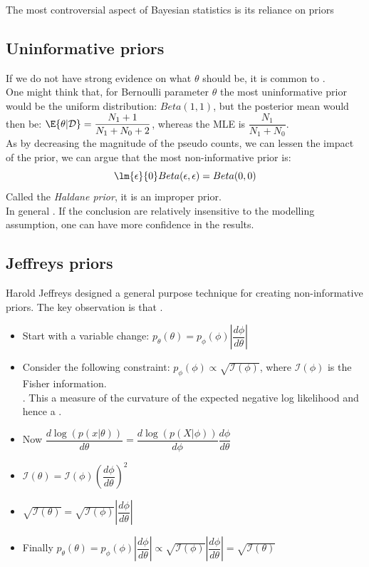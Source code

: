 The most controversial aspect of Bayesian statistics is its reliance on priors
\subsection{Uninformative priors}
If we do not have strong evidence on what $\theta$ should be, it is common to .\\
One might think that, for Bernoulli parameter $\theta$ the most uninformative prior would be the 
uniform distribution: $Beta(1, 1)$, but the posterior mean would then be: $\E{\theta|\mathcal{D}} =
\dfrac{N_{1}+1}{N_{1}+N_{0}+2}$, whereas the MLE is $\dfrac{N_{1}}{N_{1}+N_{0}}$.\\
As by decreasing the magnitude of the pseudo counts, we can lessen the impact of the 
prior, we can argue that the most non-informative prior is: 
$$\lm{\epsilon}{0} Beta(\epsilon, \epsilon) = Beta(0, 0)$$
Called the \emph{Haldane prior}, it is an improper prior.\\
In general .
If the conclusion are relatively insensitive to the modelling assumption, one can have
more confidence in the results.
\subsection{Jeffreys priors}
Harold Jeffreys designed a general purpose technique for creating non-informative priors.
The key observation is that .
\begin{itemize}
	\item Start with a variable change: $p_{\theta}(\theta) = p_{\phi}(\phi)\left|\dfrac{d\phi}{d\theta}\right|$
	\item Consider the following constraint: $p_{\phi}(\phi)\propto
		\sqrt{\mathcal{I}(\phi)}$, where $\mathcal{I}(\phi)$ is the Fisher 
        information.\\ . This a measure of the
        curvature of the expected negative log likelihood and hence a .
	\item Now $\dfrac{d\log(p(x|\theta))}{d\theta} = 
		\dfrac{d\log(p(X|\phi))}{d\phi}\dfrac{d\phi}{d\theta}$
	\item $\mathcal{I}(\theta) = \mathcal{I}(\phi)
		\left(\dfrac{d\phi}{d\theta}\right)^{2}$
	\item $\sqrt{\mathcal{I}(\theta)} = \sqrt{\mathcal{I}(\phi)}\left|\dfrac{d\phi}
		{d\theta}\right|$
	\item Finally $p_{\theta}(\theta) = p_{\phi}(\phi)\left|\dfrac{d\phi}
		{d\theta}\right| \propto \sqrt{\mathcal{I}(\phi)}\left|\dfrac{d\phi}
		{d\theta}\right| = \sqrt{\mathcal{I}(\theta)}$
\end{itemize}

